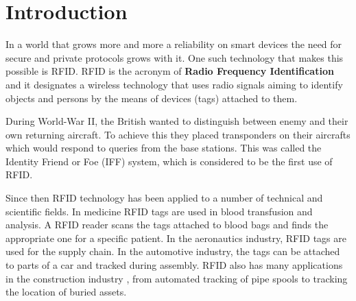 \chapter*{Introduction} 

    In a world that grows more and more a reliability on smart devices the need for secure and private protocols grows with it. One 
such technology that makes this possible is RFID. RFID is the acronym of \textbf{Radio Frequency Identification} and it designates
a wireless technology that uses radio signals aiming to identify objects and persons by the means of devices (tags) attached to them.

    During World-War II, the British wanted to distinguish between enemy and their own returning aircraft. To achieve this they placed transponders
on their aircrafts which would respond to queries from the base stations. This was called the Identity Friend or Foe (IFF) system, which is considered to be the
first use of RFID.

    Since then RFID technology has been applied to a number of technical and scientific fields. In medicine RFID tags are used in blood transfusion and analysis. 
A RFID reader scans the tags attached to blood bags and finds the appropriate one for a specific patient. In the aeronautics industry, 
RFID tags are used for the supply chain. In the automotive industry, the tags can be attached to parts of a car and tracked during assembly.
RFID also has many applications in the construction industry \cite{Domdouzis}, from automated tracking of pipe spools to tracking the 
location of buried assets.